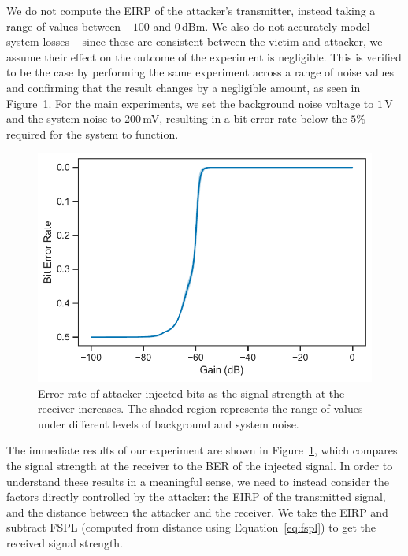 We do not compute the EIRP of the attacker's transmitter, instead taking a range of values between $-100$ and $0$\,dBm.
We also do not accurately model system losses -- since these are consistent between the victim and attacker, we assume their effect on the outcome of the experiment is negligible.
This is verified to be the case by performing the same experiment across a range of noise values and confirming that the result changes by a negligible amount, as seen in Figure~\ref{fig:overshadowing_ber}.
For the main experiments, we set the background noise voltage to $1\,$\textmu V and the system noise to $200$\,mV, resulting in a bit error rate below the $5$\% required for the system to function.

\begin{figure}
    \centering
    \includegraphics[width=\columnwidth]{diagrams/overshadowing_ber.pdf}
    \caption{Error rate of attacker-injected bits as the signal strength at the receiver increases. The shaded region represents the range of values under different levels of background and system noise.}
    \label{fig:overshadowing_ber}
\end{figure}

The immediate results of our experiment are shown in Figure~\ref{fig:overshadowing_ber}, which compares the signal strength at the receiver to the BER of the injected signal.
In order to understand these results in a meaningful sense, we need to instead consider the factors directly controlled by the attacker: the EIRP of the transmitted signal, and the distance between the attacker and the receiver.
We take the EIRP and subtract FSPL (computed from distance using Equation~\ref{eq:fspl}) to get the received signal strength.

